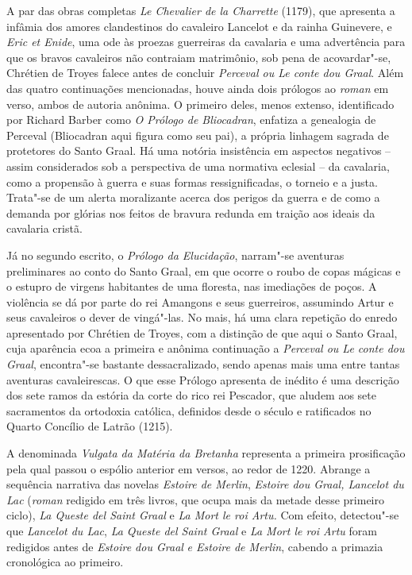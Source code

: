 A par das obras completas \textit{Le Chevalier de la Charrette }(1179), que
apresenta a infâmia dos amores clandestinos do cavaleiro Lancelot e da rainha
Guinevere, e \textit{Eric et Enide}, uma ode às proezas guerreiras da cavalaria
e uma advertência para que os bravos cavaleiros não contraiam matrimônio, sob
pena de acovardar"-se, Chrétien de Troyes falece antes de concluir
\textit{Perceval ou Le conte dou Graal}. Além das quatro continuações
mencionadas, houve ainda dois prólogos ao \textit{roman} em verso, ambos de
autoria anônima. O primeiro deles, menos extenso, identificado por Richard
Barber como \textit{O Prólogo de Bliocadran}, enfatiza a genealogia de Perceval
(Bliocadran aqui figura como seu pai), a própria linhagem sagrada de
protetores do Santo Graal. Há uma notória insistência em aspectos negativos --
assim considerados sob a perspectiva de uma normativa eclesial -- da cavalaria,
como a propensão à guerra e suas formas ressignificadas, o torneio e a justa.
Trata"-se de um alerta moralizante acerca dos perigos da guerra e de como a
demanda por glórias nos feitos de bravura redunda em traição aos ideais da
cavalaria cristã.

Já no segundo escrito, o \textit{Prólogo da Elucidação}, narram"-se aventuras
preliminares ao conto do Santo Graal, em que ocorre o roubo de copas mágicas e
o estupro de virgens habitantes de uma floresta, nas imediações de poços. A
violência se dá por parte do rei Amangons e seus guerreiros, assumindo Artur e
seus cavaleiros o dever de vingá"-las. No mais, há uma clara repetição do enredo
apresentado por Chrétien de Troyes, com a distinção de que aqui o Santo Graal,
cuja aparência ecoa a primeira e anônima continuação a \textit{Perceval ou Le
conte dou Graal}, encontra"-se bastante dessacralizado, sendo apenas mais uma
entre tantas aventuras cavaleirescas. O que esse Prólogo apresenta de inédito é
uma descrição dos sete ramos da estória da corte do rico rei Pescador, que
aludem aos sete sacramentos da ortodoxia católica, definidos desde o século 
e ratificados no Quarto Concílio de Latrão (1215).

A denominada \textit{Vulgata da Matéria da Bretanha} representa a primeira
prosificação pela qual passou o espólio anterior em versos, ao redor de 1220.
Abrange a sequência narrativa das novelas \textit{Estoire de Merlin},
\textit{Estoire dou Graal, Lancelot du Lac }(\textit{roman} redigido em três
livros, que ocupa mais da metade desse primeiro ciclo), \textit{La Queste del
Saint Graal} e \textit{La Mort le roi Artu. }Com efeito, detectou"-se que
\textit{Lancelot du Lac}, \textit{La Queste del Saint Graal} e \textit{La Mort
le roi Artu} foram redigidos antes de \textit{Estoire dou Graal} \textit{e
Estoire de Merlin}, cabendo a primazia cronológica ao primeiro. 

